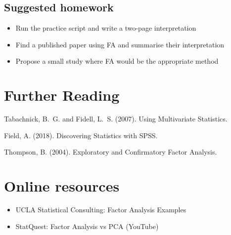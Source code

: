\documentclass[a4paper]{tufte-book}
\begin{document}
\subsection{Suggested homework}
\begin{itemize}
  \item Run the practice script and write a two-page interpretation
  \item Find a published paper using FA and summarise their interpretation
  \item Propose a small study where FA would be the appropriate method
\end{itemize}

\section{Further Reading}
\begin{thebibliography}{9}
Tabachnick, B.~G. and Fidell, L.~S. (2007).
Using Multivariate Statistics.

Field, A. (2018).
Discovering Statistics with SPSS.

Thompson, B. (2004).
Exploratory and Confirmatory Factor Analysis.
\end{thebibliography}

\section{Online resources}
\begin{itemize}
  \item UCLA Statistical Consulting: Factor Analysis Examples
  \item StatQuest: Factor Analysis vs PCA (YouTube)
\end{itemize}

\end{document}

